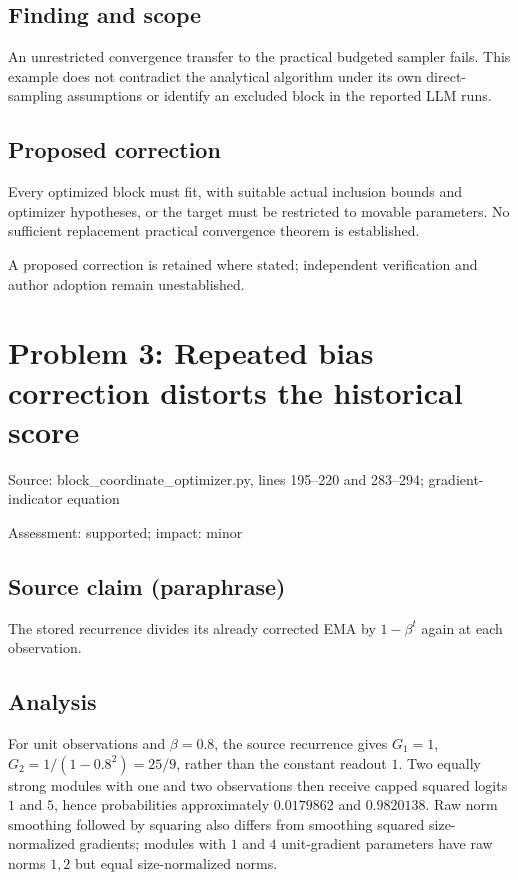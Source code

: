 \documentclass[11pt]{article}
\begin{document}
\subsection*{Finding and scope}

An unrestricted convergence transfer to the practical budgeted sampler fails. This example does not contradict the analytical algorithm under its own direct-sampling assumptions or identify an excluded block in the reported LLM runs.

\subsection*{Proposed correction}

Every optimized block must fit, with suitable actual inclusion bounds and optimizer hypotheses, or the target must be restricted to movable parameters. No sufficient replacement practical convergence theorem is established.

A proposed correction is retained where stated; independent verification and author adoption remain unestablished.

\section*{Problem 3: Repeated bias correction distorts the historical score}

Source: block\_coordinate\_optimizer.py, lines 195–220 and 283–294; gradient-indicator equation

Assessment: supported; impact: minor

\subsection*{Source claim (paraphrase)}

The stored recurrence divides its already corrected EMA by \(1-\beta^t\) again at each observation.

\subsection*{Analysis}

For unit observations and \(\beta=0.8\), the source recurrence gives \(G_1=1\), \(G_2=1/(1-0.8^2)=25/9\), rather than the constant readout \(1\). Two equally strong modules with one and two observations then receive capped squared logits \(1\) and \(5\), hence probabilities approximately \(0.0179862\) and \(0.9820138\). Raw norm smoothing followed by squaring also differs from smoothing squared size-normalized gradients; modules with \(1\) and \(4\) unit-gradient parameters have raw norms \(1,2\) but equal size-normalized norms.
\end{document}
